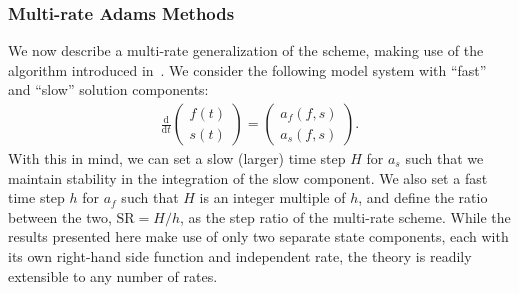 
\subsubsection{Multi-rate Adams Methods} \label{sec:multirate}

We now describe a multi-rate generalization of the scheme, making use of the
algorithm introduced in~\cite{gear1984multirate}.  We consider the following
model system with ``fast'' and ``slow'' solution components:
\begin{align}
\frac{\textrm{d}}{\textrm{d}t}\left( \begin{array}{c} f(t) \\ s(t) \end{array} \right) = \left( \begin{array}{c} a_{f}(f,s) \\ a_{s}(f,s) \end{array} \right). \label{eq:mrab}
\end{align}
With this in mind, we can set a slow (larger) time step $H$ for $a_{s}$ such
that we maintain stability in the integration of the slow component.  We also
set a fast time step $h$ for $a_{f}$ such that $H$ is an integer multiple of
$h$, and define the ratio between the two, $\text{SR} = H/h$, as the step ratio
of the multi-rate scheme. While the results presented here make use of only two 
separate state components, each with its own right-hand side function and
independent rate, the theory is readily extensible to any number of rates.

